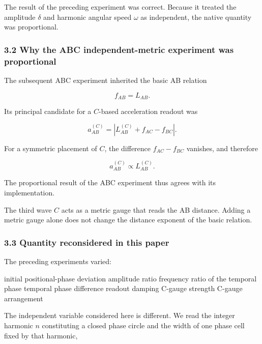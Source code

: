 \documentclass[
  10pt,
  a4paper,
]{article}
\newenvironment{Shaded}{}{}
\newcommand{\NormalTok}[1]{#1}
\begin{document}
The result of the preceding experiment was correct. Because it treated
the amplitude \(\delta\) and harmonic angular speed \(\omega\) as
independent, the native quantity was proportional.

\subsubsection{3.2 Why the ABC independent-metric experiment was
proportional}\label{why-the-abc-independent-metric-experiment-was-proportional}

The subsequent ABC experiment inherited the basic AB relation

\[
f_{AB}=L_{AB}.
\]

Its principal candidate for a \(C\)-based acceleration readout was

\[
a_{AB}^{(C)}
=\left|L_{AB}^{(C)}+f_{AC}-f_{BC}\right|.
\]

For a symmetric placement of \(C\), the difference \(f_{AC}-f_{BC}\)
vanishes, and therefore

\[
a_{AB}^{(C)}\propto L_{AB}^{(C)}.
\]

The proportional result of the ABC experiment thus agrees with its
implementation.

The third wave \(C\) acts as a metric gauge that reads the AB distance.
Adding a metric gauge alone does not change the distance exponent of the
basic relation.

\subsubsection{3.3 Quantity reconsidered in this
paper}\label{quantity-reconsidered-in-this-paper}

The preceding experiments varied:

\begin{Shaded}
\begin{Highlighting}[]
\NormalTok{initial positional{-}phase deviation}
\NormalTok{amplitude ratio}
\NormalTok{frequency ratio of the temporal phase}
\NormalTok{temporal phase difference}
\NormalTok{readout damping}
\NormalTok{C{-}gauge strength}
\NormalTok{C{-}gauge arrangement}
\end{Highlighting}
\end{Shaded}

The independent variable considered here is different. We read the
integer harmonic \(n\) constituting a closed phase circle and the width
of one phase cell fixed by that harmonic,
\end{document}

